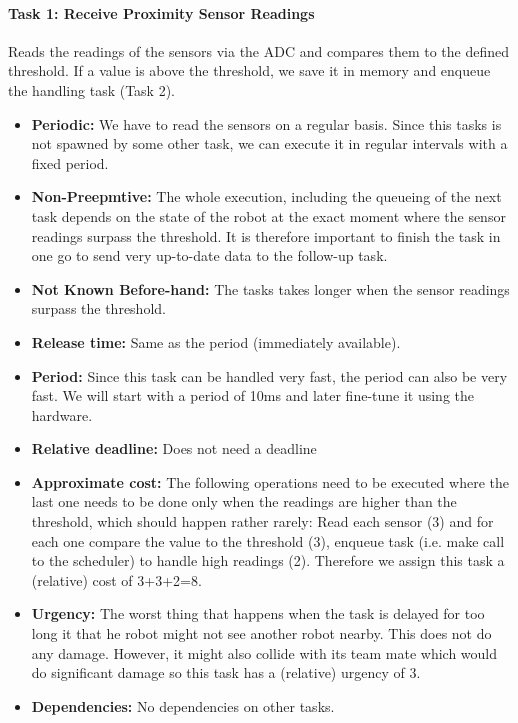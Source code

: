 \documentclass[12pt]{article}
\begin{document}
\paragraph{Task 1: Receive Proximity Sensor Readings}
Reads the readings of the sensors via the ADC and compares them to the defined threshold. If a value is above the threshold, we save it in memory and enqueue the handling task (Task 2).
  	\begin{itemize}
  	\item \textbf{Periodic:} We have to read the sensors on a regular basis. Since this tasks is not spawned by some other task, we can execute it in regular intervals with a fixed period.
	\item \textbf{Non-Preepmtive:} The whole execution, including the queueing of the next task depends on the state of the robot at the exact moment where the sensor readings surpass the threshold. It is therefore important to finish the task in one go to send very up-to-date data to the follow-up task.
  	\item \textbf{Not Known Before-hand:} The tasks takes longer when the sensor readings surpass the threshold.
  	\item \textbf{Release time:} Same as the period (immediately available).
  	\item \textbf{Period:} Since this task can be handled very fast, the period can also be very fast. We will start with a period of 10ms and later fine-tune it using the hardware.
  	\item \textbf{Relative deadline:} Does not need a deadline
  	\item \textbf{Approximate cost:} The following operations need to be executed where the last one needs to be done only when the readings are higher than the threshold, which should happen rather rarely: Read each sensor (3) and for each one compare the value to the threshold (3), enqueue task (i.e. make call to the scheduler) to handle high readings (2). Therefore we assign this task a (relative) cost of 3+3+2=8.
  	\item \textbf{Urgency:} The worst thing that happens when the task is delayed for too long it that he robot might not see another robot nearby. This does not do any damage. However, it might also collide with its team mate which would do significant damage so this task has a (relative) urgency of 3.
  	\item \textbf{Dependencies:} No dependencies on other tasks.
  	\end{itemize}
\end{document}
